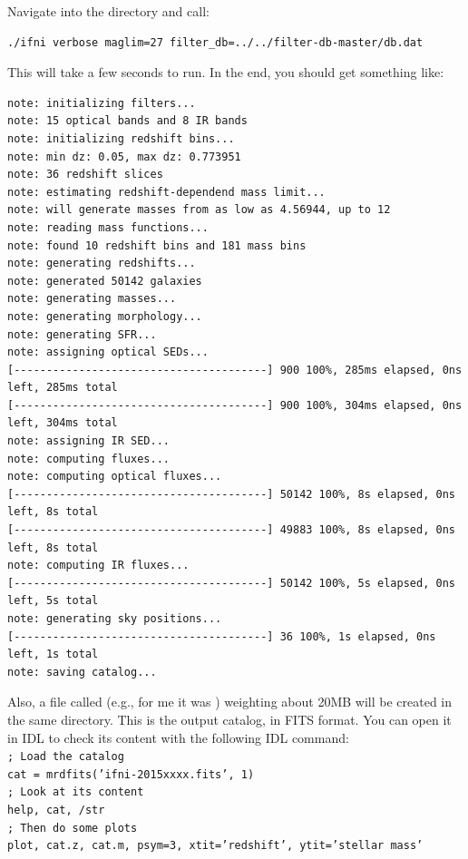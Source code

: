 \documentclass[12pt,a4paper]{article}
\begin{document}
Navigate into the  directory and call:
\begin{verbatim}
./ifni verbose maglim=27 filter_db=../../filter-db-master/db.dat
\end{verbatim}

This will take a few seconds to run. In the end, you should get something like:
\begin{verbatim}
note: initializing filters...
note: 15 optical bands and 8 IR bands
note: initializing redshift bins...
note: min dz: 0.05, max dz: 0.773951
note: 36 redshift slices
note: estimating redshift-dependend mass limit...
note: will generate masses from as low as 4.56944, up to 12
note: reading mass functions...
note: found 10 redshift bins and 181 mass bins
note: generating redshifts...
note: generated 50142 galaxies
note: generating masses...
note: generating morphology...
note: generating SFR...
note: assigning optical SEDs...
[---------------------------------------] 900 100%, 285ms elapsed, 0ns left, 285ms total
[---------------------------------------] 900 100%, 304ms elapsed, 0ns left, 304ms total
note: assigning IR SED...
note: computing fluxes...
note: computing optical fluxes...
[---------------------------------------] 50142 100%, 8s elapsed, 0ns left, 8s total
[---------------------------------------] 49883 100%, 8s elapsed, 0ns left, 8s total
note: computing IR fluxes...
[---------------------------------------] 50142 100%, 5s elapsed, 0ns left, 5s total
note: generating sky positions...
[---------------------------------------] 36 100%, 1s elapsed, 0ns left, 1s total
note: saving catalog...
\end{verbatim}

Also, a file called  (e.g., for me it was ) weighting about 20MB will be created in the same directory. This is the output catalog, in FITS format. You can open it in IDL to check its content with the following IDL command: \\[0.5cm]
\noindent \texttt{\color{gray}; Load the catalog} \\
\noindent \texttt{cat = mrdfits({\color{DodgerBlue}'ifni-2015xxxx.fits'}, {\color{red}1})} \\
\noindent \texttt{\color{gray}; Look at its content} \\
\noindent \texttt{{\color{Green}help}, cat, /str} \\
\noindent \texttt{\color{gray}; Then do some plots} \\
\noindent \texttt{{\color{Green}plot}, cat.z, cat.m, psym={\color{red}3}, xtit={\color{DodgerBlue}'redshift'}, ytit={\color{DodgerBlue}'stellar mass'}} \\
\end{document}
